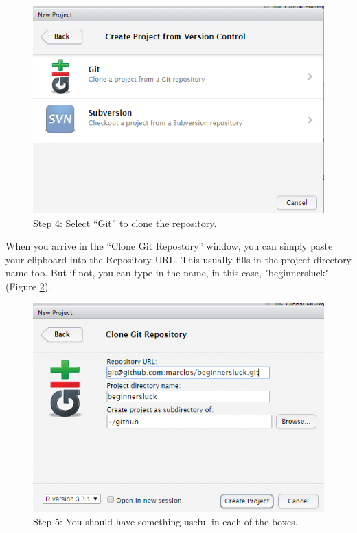 \documentclass[12pt]{../SOP3_beta}
\begin{document}
\begin{figure}[H]
\includegraphics{graphics/RstudioNewProject2.jpg}
\caption{Step 4: Select ``Git'' to clone the repository.}
\label{fig:step4}
\end{figure}

When you arrive in the ``Clone Git Repostory'' window, you can simply paste your clipboard into the Repository URL. This usually fills in the project directory name too. But if not, you can type in the name, in this case, "beginnersluck" (Figure \ref{fig:step5}).

\begin{figure}[H]
\includegraphics{graphics/RstudioNewProject3.jpg}
\caption{Step 5: You should have something useful in each of the boxes.}
\label{fig:step5}
\end{figure}
\end{document}
